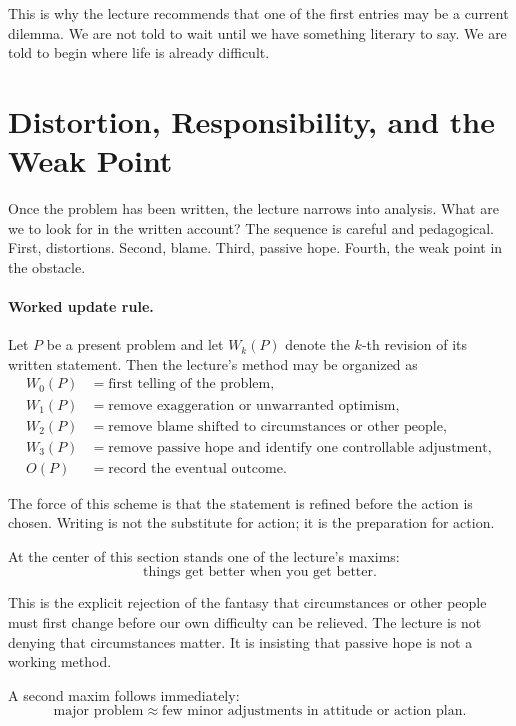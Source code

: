 This is why the lecture recommends that one of the first entries may be a current dilemma. We are not told to wait until we have something literary to say. We are told to begin where life is already difficult.

\section{Distortion, Responsibility, and the Weak Point}

Once the problem has been written, the lecture narrows into analysis. What are we to look for in the written account? The sequence is careful and pedagogical. First, distortions. Second, blame. Third, passive hope. Fourth, the weak point in the obstacle.

\paragraph{Worked update rule.}
Let \(P\) be a present problem and let \(W_k(P)\) denote the \(k\)-th revision of its written statement. Then the lecture's method may be organized as
\begin{align}
W_0(P)&=\text{first telling of the problem},\\
W_1(P)&=\text{remove exaggeration or unwarranted optimism},\\
W_2(P)&=\text{remove blame shifted to circumstances or other people},\\
W_3(P)&=\text{remove passive hope and identify one controllable adjustment},\\
O(P)&=\text{record the eventual outcome}.
\end{align}

The force of this scheme is that the statement is refined before the action is chosen. Writing is not the substitute for action; it is the preparation for action.

At the center of this section stands one of the lecture's maxims:
\begin{equation}
\text{things get better when you get better}.
\end{equation}

This is the explicit rejection of the fantasy that circumstances or other people must first change before our own difficulty can be relieved. The lecture is not denying that circumstances matter. It is insisting that passive hope is not a working method.

A second maxim follows immediately:
\begin{equation}
\text{major problem}\approx \text{few minor adjustments in attitude or action plan}.
\end{equation}

